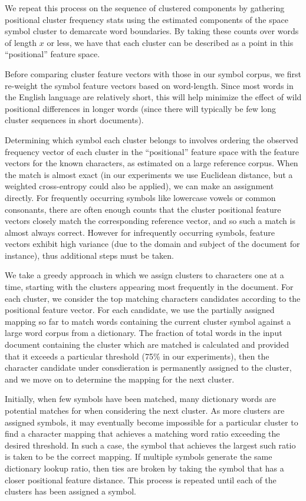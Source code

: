 \documentclass[times, 10pt,twocolumn]{article}
\begin{document}
We repeat this process on the sequence of clustered components by
gathering positional cluster frequency stats using the estimated
components of the space symbol cluster to demarcate word boundaries.
By taking these counts over words of length $x$ or less, we have that
each cluster can be described as a point in this ``positional''
feature space.

Before comparing cluster feature vectors with those in our symbol
corpus, we first re-weight the symbol feature vectors based on
word-length.  Since most words in the English language are relatively
short, this will help minimize the effect of wild positional
differences in longer words (since there will typically be few long
cluster sequences in short documents).

Determining which symbol each cluster belongs to involves ordering the
observed frequency vector of each cluster in the ``positional''
feature space with the feature vectors for the known characters, as
estimated on a large reference corpus. When the match is almost exact
(in our experiments we use Euclidean distance, but a weighted
cross-entropy could also be applied), we can make an assignment
directly.  For frequently occurring symbols like lowercase vowels or
common consonants, there are often enough counts that the cluster
positional feature vectors closely match the corresponding reference
vector, and so such a match is almost always correct.  However for
infrequently occurring symbols, feature vectors exhibit high variance
(due to the domain and subject of the document for instance), thus
additional steps must be taken.

We take a greedy approach in which we assign clusters to characters
one at a time, starting with the clusters appearing most frequently in
the document. For each cluster, we consider the top matching
characters candidates according to the positional feature vector.  For
each candidate, we use the partially assigned mapping so far to match
words containing the current cluster symbol against a large word
corpus from a dictionary. The fraction of total words in the input
document containing the cluster which are matched is calculated and
provided that it exceeds a particular threshold (75\% in our
experiments), then the character candidate under consdieration is
permanently assigned to the cluster, and we move on to determine the
mapping for the next cluster.

Initially, when few symbols have been matched, many dictionary words
are potential matches for when considering the next cluster. As more
clusters are assigned symbols, it may eventually become impossible for
a particular cluster to find a character mapping that achieves a
matching word ratio exceeding the desired threshold.  In such a case,
the symbol that achieves the largest such ratio is taken to be the
correct mapping.  If multiple symbols generate the same dictionary
lookup ratio, then ties are broken by taking the symbol that has a
closer positional feature distance.  This process is repeated until
each of the clusters has been assigned a symbol.
\end{document}
